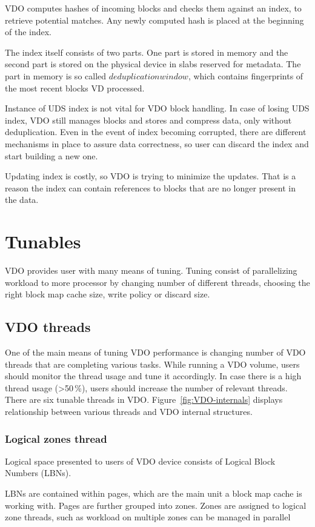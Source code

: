 \documentclass[
  color, %
  table, %
  lof,   %
  lot,   %
]{fithesis3}
\begin{document}
VDO computes hashes of incoming blocks and checks them against an index, to retrieve potential matches. Any newly computed hash is placed at the beginning of the index.

The index itself consists of two parts. One part is stored in memory and the second part is stored on the physical device in slabs reserved for metadata. The part in memory is so called $deduplication window$, which contains fingerprints of the most recent blocks VD processed. 

Instance of UDS index is not vital for VDO block handling. In case of losing UDS index, VDO still manages blocks and stores and compress data, only without deduplication. Even in the event of index becoming corrupted, there are different mechanisms in place to assure data correctness, so user can discard the index and start building a new one.

Updating index is costly, so VDO is trying to minimize the updates. That is a reason the index can contain references to blocks that are no longer present in the data.


\section{Tunables}
VDO provides user with many means of tuning. Tuning consist of parallelizing workload to more processor by changing number of different threads, choosing the right block map cache size, write policy or discard size.

\subsection{VDO threads}
One of the main means of tuning VDO performance is changing number of VDO threads that are completing various tasks. While running a VDO volume, users should monitor the thread usage and tune it accordingly. In case there is a high thread usage (>50\,\%), users should increase the number of relevant threads. There are six tunable threads in VDO. Figure~\ref{fig:VDO-internals} displays relationship between various threads and VDO internal structures.

\subsubsection{Logical zones thread}
Logical space presented to users of VDO device consists of Logical Block Numbers (LBNs).

LBNs are contained within pages, which are the main unit a block map cache is working with. Pages are further grouped into zones. Zones are assigned to logical zone threads, such as workload on multiple zones can be managed in parallel
\end{document}
